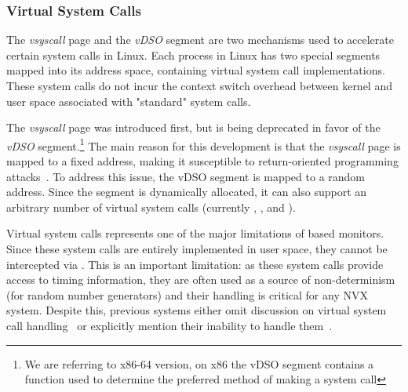 \subsubsection{Virtual System Calls}
\label{sec:vsyscall}

The \emph{vsyscall} page and the \emph{vDSO} segment are two
mechanisms used to accelerate certain system calls in Linux. Each
process in Linux has two special segments mapped into its address
space, containing virtual system call implementations. These system
calls do not incur the context switch overhead between kernel and
user space associated with "standard" system calls.

The \emph{vsyscall} page was introduced first, but is being deprecated in favor
of the \emph{vDSO} segment.\footnote{We are referring to x86-64 version, on x86
the vDSO segment contains a function used to determine the preferred method of
making a system call} The main reason for this development is that the
\emph{vsyscall} page is mapped to a fixed address, making it susceptible to
return-oriented programming attacks~\cite{ROP:tissec12}. To address this issue,
the vDSO segment is mapped to a random address. Since the segment is
dynamically allocated, it can also support an arbitrary number of virtual
system calls (currently , , 
and ).

Virtual system calls represents one of the major limitations of
 based monitors. Since these system calls are entirely
implemented in user space, they cannot be intercepted via \ptrace.
This is an important limitation: as these system calls provide access
to timing information, they are often used as a source of
non-determinism (\eg for random number generators) and their handling
is critical for any NVX system. Despite this, previous systems either
omit discussion on virtual system call handling~\cite{mx,orchestra11}
or explicitly mention their inability to handle them~\cite{tachyon12}.


